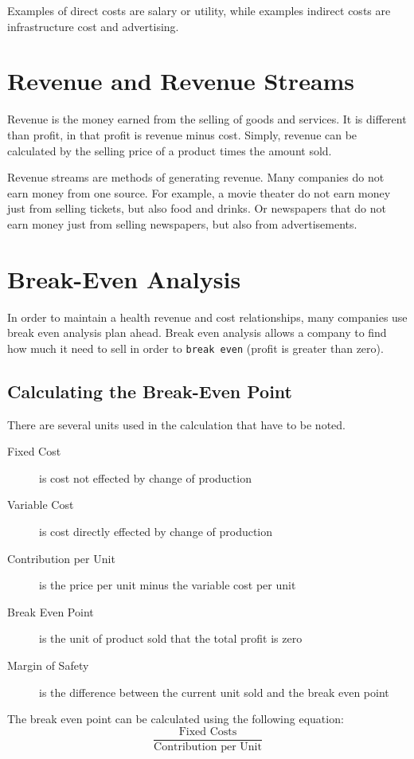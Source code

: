 \documentclass{standalone}
\begin{document}
Examples of direct costs are salary or utility, while examples indirect costs are infrastructure cost and advertising.

\section{Revenue and Revenue Streams}
Revenue is the money earned from the selling of goods and services.
It is different than profit, in that profit is revenue minus cost.
Simply, revenue can be calculated by the selling price of a product times the amount sold.

Revenue streams are methods of generating revenue.
Many companies do not earn money from one source.
For example, a movie theater do not earn money just from selling tickets, but also food and drinks.
Or newspapers that do not earn money just from selling newspapers, but also from advertisements.

\section{Break-Even Analysis}
In order to maintain a health revenue and cost relationships, many companies use break even analysis plan ahead.
Break even analysis allows a company to find how much it need to sell in order to \texttt{break even} (profit is greater than zero).

\subsection{Calculating the Break-Even Point}
There are several units used in the calculation that have to be noted.

\begin{description}
    \item[Fixed Cost] is cost not effected by change of production
    \item[Variable Cost] is cost directly effected by change of production
    \item[Contribution per Unit] is the price per unit minus the variable cost per unit
    \item[Break Even Point] is the unit of product sold that the total profit is zero
    \item[Margin of Safety] is the difference between the current unit sold and the break even point
\end{description}

The break even point can be calculated using the following equation:
\begin{equation}
    \frac{\textrm{Fixed Costs}}{\textrm{Contribution per Unit}} 
\end{equation}
\end{document}
